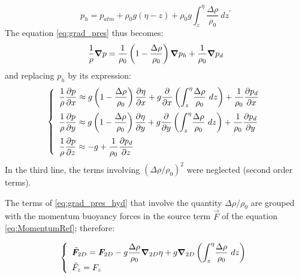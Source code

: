 \begin{equation}
p_h=p_{atm}+\rho_{0}g\left(  \eta-z\right)  +\rho_{0}g\int\nolimits_{z}^{\eta%
}\dfrac{\Delta\rho}{\rho_{0}}~dz^{\prime} \label{valeurdep}%
\end{equation}
The equation \eqref{eq:grad_pres} thus becomes:
\begin{equation}
  \dfrac{1}{\rho}\bm{\nabla} p  = \dfrac{1}{\rho_0}\left(1-\dfrac{\Delta\rho}{\rho_0}\right)\bm{\nabla} p_h + \dfrac{1}{\rho_0}\bm{\nabla} p_d
\end{equation}
and replacing $p_h$ by its expression:
\begin{equation}
\left\{\begin{array}{l}
\dfrac{1}{\rho}\dfrac{\partial p}{\partial x} \approx g\left(1 - \dfrac{\Delta \rho}{\rho_0}\right)\dfrac{\partial \eta}{\partial x}
+ g\dfrac{\partial}{\partial x} \left(\displaystyle{\int_z^\eta}\dfrac{\Delta\rho}{\rho_0}~dz\right)+ \dfrac{1}{\rho_0}\dfrac{\partial p_d}{\partial x}\medskip \\
\dfrac{1}{\rho}\dfrac{\partial p}{\partial y} \approx g\left(1 - \dfrac{\Delta \rho}{\rho_0}\right)\dfrac{\partial \eta}{\partial y}
+ g\dfrac{\partial}{\partial y} \left(\displaystyle{\int_z^\eta}\dfrac{\Delta\rho}{\rho_0}~dz\right)+ \dfrac{1}{\rho_0}\dfrac{\partial p_d}{\partial y}\medskip \\
\dfrac{1}{\rho}\dfrac{\partial p}{\partial z} \approx - g + \dfrac{1}{\rho_0}\dfrac{\partial p_d}{\partial z}\\
\end{array}\right.
  \label{eq:grad_pres_hyd}
\end{equation}
In the third line, the terms involving $\left(\Delta \rho/\rho_0\right)^2$ were neglected (second order terms).

The terms of \eqref{eq:grad_pres_hyd} that involve the quantity $\Delta\rho/\rho_0$
are grouped with the momentum buoyancy forces in the source term $\vec{F}$ of the equation \eqref{eq:MomentumRef}; therefore:

\begin{equation}\left\{\begin{array}{l}
  \tilde{\bm{F}}_{2D} = \bm{F}_{2D}
  - g\dfrac{\Delta\rho}{\rho_0}\bm{\nabla}_{2D}\eta
  + g\bm{\nabla}_{2D}\left(\displaystyle{\int_z^\eta}\dfrac{\Delta\rho}{\rho_0}~dz\right) \\
    \tilde{F}_{z} = F_{z}\end{array}\right.
  \label{eq:buoyancyTerms}
\end{equation}

